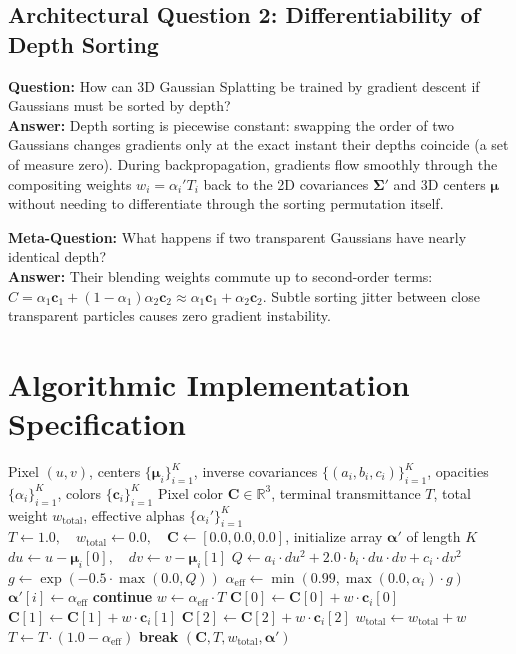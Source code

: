 \documentclass[11pt,a4paper]{article}
\theoremstyle{definition}
\begin{document}
\subsection{Architectural Question 2: Differentiability of Depth Sorting}
\textbf{Question:} How can 3D Gaussian Splatting be trained by gradient descent if Gaussians must be sorted by depth?\\
\textbf{Answer:} Depth sorting is piecewise constant: swapping the order of two Gaussians changes gradients only at the exact instant their depths coincide (a set of measure zero). During backpropagation, gradients flow smoothly through the compositing weights $w_i = \alpha_i' T_i$ back to the 2D covariances $\boldsymbol{\Sigma}'$ and 3D centers $\boldsymbol{\mu}$ without needing to differentiate through the sorting permutation itself.

\textbf{Meta-Question:} What happens if two transparent Gaussians have nearly identical depth?\\
\textbf{Answer:} Their blending weights commute up to second-order terms: $C = \alpha_1 \mathbf{c}_1 + (1-\alpha_1)\alpha_2 \mathbf{c}_2 \approx \alpha_1 \mathbf{c}_1 + \alpha_2 \mathbf{c}_2$. Subtle sorting jitter between close transparent particles causes zero gradient instability.

\section{Algorithmic Implementation Specification}

\begin{algorithm}[H]
\caption{3D Gaussian Splatting 2D Pixel Rasterization}
\begin{algorithmic}[1]
\Require Pixel $(u, v)$, centers $\{\boldsymbol{\mu}_i\}_{i=1}^K$, inverse covariances $\{(a_i, b_i, c_i)\}_{i=1}^K$, opacities $\{\alpha_i\}_{i=1}^K$, colors $\{\mathbf{c}_i\}_{i=1}^K$
\Ensure Pixel color $\mathbf{C} \in \mathbb{R}^3$, terminal transmittance $T$, total weight $w_{\text{total}}$, effective alphas $\{\alpha_i'\}_{i=1}^K$
\State $T \gets 1.0, \quad w_{\text{total}} \gets 0.0, \quad \mathbf{C} \gets [0.0, 0.0, 0.0]$, initialize array $\boldsymbol{\alpha}'$ of length $K$
    \State $du \gets u - \boldsymbol{\mu}_i[0], \quad dv \gets v - \boldsymbol{\mu}_i[1]$
    \State $Q \gets a_i \cdot du^2 + 2.0 \cdot b_i \cdot du \cdot dv + c_i \cdot dv^2$
    \State $g \gets \exp(-0.5 \cdot \max(0.0, Q))$
    \State $\alpha_{\text{eff}} \gets \min(0.99, \max(0.0, \alpha_i) \cdot g)$
    \State $\boldsymbol{\alpha}'[i] \gets \alpha_{\text{eff}}$
     \textbf{continue} \EndIf
    \State $w \gets \alpha_{\text{eff}} \cdot T$
    \State $\mathbf{C}[0] \gets \mathbf{C}[0] + w \cdot \mathbf{c}_i[0]$
    \State $\mathbf{C}[1] \gets \mathbf{C}[1] + w \cdot \mathbf{c}_i[1]$
    \State $\mathbf{C}[2] \gets \mathbf{C}[2] + w \cdot \mathbf{c}_i[2]$
    \State $w_{\text{total}} \gets w_{\text{total}} + w$
    \State $T \gets T \cdot (1.0 - \alpha_{\text{eff}})$
     \textbf{break} \EndIf
\EndFor
\State \Return $(\mathbf{C}, T, w_{\text{total}}, \boldsymbol{\alpha}')$
\end{algorithmic}
\end{algorithm}
\end{document}
